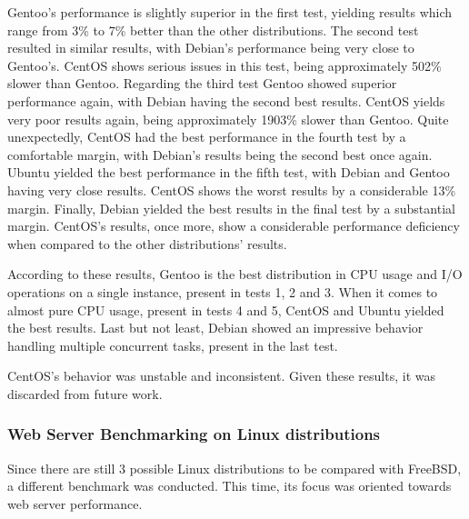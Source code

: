 Gentoo's performance is slightly superior in the first test, yielding results which range from 3\% to 7\% better than the other distributions. The second test resulted in similar results, with Debian's performance being very close to Gentoo's. CentOS shows serious issues in this test, being approximately 502\% slower than Gentoo. Regarding the third test Gentoo showed superior performance again, with Debian having the second best results. CentOS yields very poor results again, being approximately 1903\% slower than Gentoo. Quite unexpectedly, CentOS had the best performance in the fourth test by a comfortable margin, with Debian's results being the second best once again. Ubuntu yielded the best performance in the fifth test, with Debian and Gentoo having very close results. CentOS shows the worst results by a considerable 13\% margin. Finally, Debian yielded the best results in the final test by a substantial margin. CentOS's results, once more, show a considerable performance deficiency when compared to the other distributions' results.

According to these results, Gentoo is the best distribution in CPU usage and I/O operations on a single instance, present in tests 1, 2 and 3. When it comes to almost pure CPU usage, present in tests 4 and 5, CentOS and Ubuntu yielded the best results. Last but not least, Debian showed an impressive behavior handling multiple concurrent tasks, present in the last test.

CentOS's behavior was unstable and inconsistent. Given these results, it was discarded from future work.

\subsubsection{Web Server Benchmarking on Linux distributions}
Since there are still 3 possible Linux distributions to be compared with FreeBSD, a different benchmark was conducted. This time, its focus was oriented towards web server performance.

